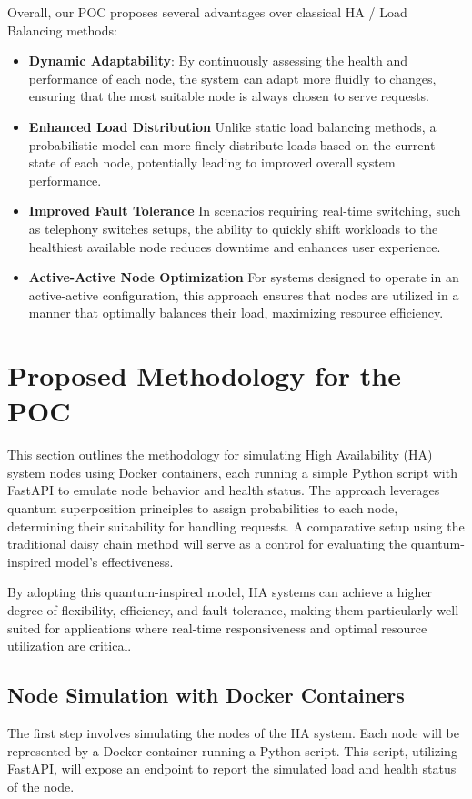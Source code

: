 \documentclass[12pt]{article}
\begin{document}
Overall, our POC proposes several advantages over classical HA / Load Balancing methods:
\begin{itemize}
    \item \textbf{Dynamic Adaptability}: By continuously assessing the health and performance of each node, the system can adapt more fluidly to changes, ensuring that the most suitable node is always chosen to serve requests.
\item \textbf{Enhanced Load Distribution} Unlike static load balancing methods, a probabilistic model can more finely distribute loads based on the current state of each node, potentially leading to improved overall system performance.
\item \textbf{Improved Fault Tolerance} In scenarios requiring real-time switching, such as telephony switches setups, the ability to quickly shift workloads to the healthiest available node reduces downtime and enhances user experience.
\item \textbf{Active-Active Node Optimization} For systems designed to operate in an active-active configuration, this approach ensures that nodes are utilized in a manner that optimally balances their load, maximizing resource efficiency.
\end{itemize}
\newpage
\section{Proposed Methodology for the POC}

This section outlines the methodology for simulating High Availability (HA) system nodes using Docker containers, each running a simple Python script with FastAPI to emulate node behavior and health status. The approach leverages quantum superposition principles to assign probabilities to each node, determining their suitability for handling requests. A comparative setup using the traditional daisy chain method will serve as a control for evaluating the quantum-inspired model's effectiveness.


By adopting this quantum-inspired model, HA systems can achieve a higher degree of flexibility, efficiency, and fault tolerance, making them particularly well-suited for applications where real-time responsiveness and optimal resource utilization are critical.

\subsection{Node Simulation with Docker Containers}
The first step involves simulating the nodes of the HA system. Each node will be represented by a Docker container running a Python script. This script, utilizing FastAPI, will expose an endpoint to report the simulated load and health status of the node.
\end{document}
